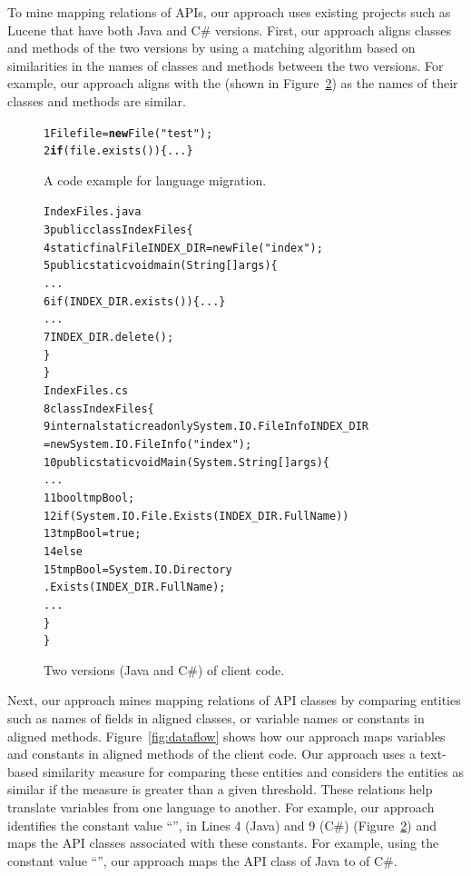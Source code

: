 To mine mapping relations of APIs, our approach uses existing projects such as
Lucene that have both Java and C\# versions. First, our approach aligns 
classes and methods of the two versions by using 
a matching algorithm based on similarities in the names of classes 
and methods between the two versions. For example, our approach aligns 
 with the  
(shown in Figure~\ref{fig:clientcode}) as the names of their classes and methods are similar.

\begin{figure}[t]
\begin{CodeOut}
\begin{alltt}
1  File file = \textbf{new} File("test");
2    \textbf{if}(file.exists())\{...\}
\end{alltt}
\end{CodeOut}\vspace*{-4ex}
\caption{\label{fig:totranslation} A code example for language
migration.}%
\end{figure}
\begin{figure}[t]
\begin{CodeOut}\vspace*{-2ex}
\begin{alltt}
                  IndexFiles.java
3 public class IndexFiles \{
4   static final File INDEX_DIR = new File("index");
5   public static void main(String[] args) \{
      ...
6     if (INDEX_DIR.exists()) \{...\}
      ...
7       INDEX_DIR.delete();
    \}
  \}
                  IndexFiles.cs
8 class IndexFiles\{
9   internal static readonly System.IO.FileInfo INDEX_DIR
          = new System.IO.FileInfo("index");
10   public static void  Main(System.String[] args)\{
      ...
11     bool tmpBool;
12     if (System.IO.File.Exists(INDEX_DIR.FullName))
13       tmpBool = true;
14    else
15       tmpBool = System.IO.Directory
                         .Exists(INDEX_DIR.FullName);
      ...
    \}
 \}
\end{alltt}
\end{CodeOut}\vspace*{-4ex}
\caption{\label{fig:clientcode} Two versions (Java and C\#) of
client code.}\vspace*{-4ex}
\end{figure}

Next, our approach mines mapping relations of API classes by comparing entities such as
names of fields in aligned classes, or variable names or constants in aligned methods. 
Figure~\ref{fig:dataflow} shows how our approach maps variables and constants in aligned methods 
of the client code. Our approach uses a text-based similarity measure for comparing these entities
and considers the entities as similar if the measure is greater than a given threshold.
These relations help translate variables from one language to another. 
For example, our approach identifies the constant value ``'',
in Lines 4 (Java) and 9 (C\#) (Figure~\ref{fig:clientcode}) and
maps the API classes associated with these constants. For example,
using the constant value ``'', our approach maps the API
class  of Java to  of C\#.  


